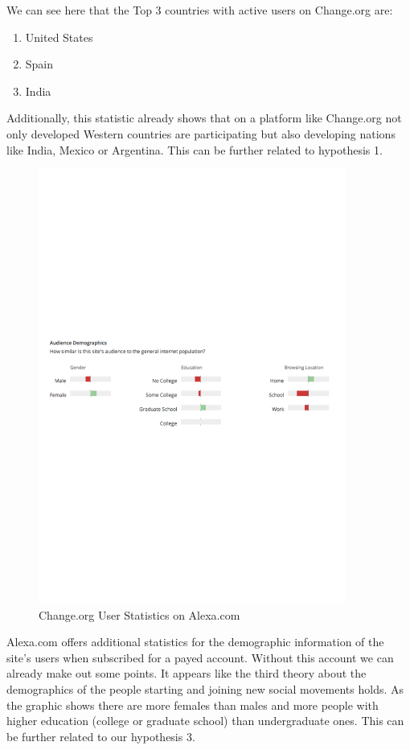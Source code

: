 We can see here that the Top 3 countries with active users on Change.org are:
\begin{enumerate}
\item United States
\item Spain
\item India
\end{enumerate}

Additionally, this statistic already shows that on a platform like Change.org not only developed Western countries are participating but also developing nations like India, Mexico or Argentina. This can be further related to hypothesis 1.

\begin{figure}[H]
\centering
\includegraphics[width=0.9\textwidth]{assets/ChangeUserStats.pdf}
\caption{Change.org User Statistics on Alexa.com}
\label{fig:change.org_UserStats}
\end{figure}

Alexa.com offers additional statistics for the demographic information of the site's users when subscribed for a payed account. Without this account we can already make out some points. It appears like the third theory about the demographics of the people starting and joining new social movements holds. As the graphic shows there are more females than males and more people with higher education (college or graduate school) than undergraduate ones. This can be further related to our hypothesis 3.

